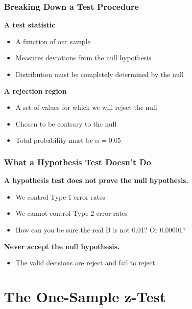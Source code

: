 \documentclass[12pt, block=fill]{beamer}
\begin{document}
\begin{frame}
  \frametitle{Breaking Down a Test Procedure}
  
  \textbf{A test statistic}
  \begin{itemize}
  \item A function of our sample
  \item Measures deviations from the null hypothesis
  \item Distribution must be completely determined by the null
  \end{itemize}

  \textbf{A rejection region}
  \begin{itemize}
  \item  A set of values for which we will reject the null
  \item  Chosen to be contrary to the null
  \item Total probability must be $\alpha = 0.05$
  \end{itemize}
\end{frame}

\begin{frame}
  \frametitle{What a Hypothesis Test Doesn't Do}

  \textbf{A hypothesis test does not prove the null hypothesis.}
  
  \begin{itemize}
  \item We control Type 1 error rates
  \item We cannot control Type 2 error rates
  \item How can you be sure the real B is not 0.01?  Or 0.00001?
  \end{itemize}
  
    \textbf{Never accept the null hypothesis.}
\begin{itemize}
\item The valid decisions are reject and fail to reject.
\end{itemize}

  
\end{frame}

\section{The One-Sample z-Test}
\end{document}
